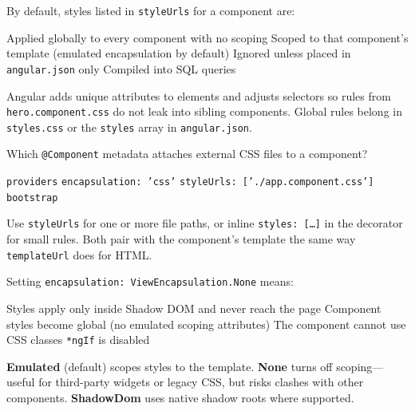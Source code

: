\question[4]
By default, styles listed in \texttt{styleUrls} for a component are:
\begin{choices}
  \choice Applied globally to every component with no scoping
  \CorrectChoice Scoped to that component's template (emulated encapsulation by default)
  \choice Ignored unless placed in \texttt{angular.json} only
  \choice Compiled into SQL queries
\end{choices}
\begin{solution}
  Angular adds unique attributes to elements and adjusts selectors so rules from \texttt{hero.component.css} do not leak into sibling components. Global rules belong in \texttt{styles.css} or the \texttt{styles} array in \texttt{angular.json}.
\end{solution}

\question[4]
Which \texttt{@Component} metadata attaches external CSS files to a component?
\begin{choices}
  \choice \texttt{providers}
  \choice \texttt{encapsulation: 'css'}
  \CorrectChoice \texttt{styleUrls: ['./app.component.css']}
  \choice \texttt{bootstrap}
\end{choices}
\begin{solution}
  Use \texttt{styleUrls} for one or more file paths, or inline \texttt{styles: [\ldots]} in the decorator for small rules. Both pair with the component's template the same way \texttt{templateUrl} does for HTML.
\end{solution}

\question[4]
Setting \lstinline[style=tsinline]|encapsulation: ViewEncapsulation.None| means:
\begin{choices}
  \choice Styles apply only inside Shadow DOM and never reach the page
  \CorrectChoice Component styles become global (no emulated scoping attributes)
  \choice The component cannot use CSS classes
  \choice \lstinline[style=htmlinline]|*ngIf| is disabled
\end{choices}
\begin{solution}
  \textbf{Emulated} (default) scopes styles to the template. \textbf{None} turns off scoping---useful for third-party widgets or legacy CSS, but risks clashes with other components. \textbf{ShadowDom} uses native shadow roots where supported.
\end{solution}

